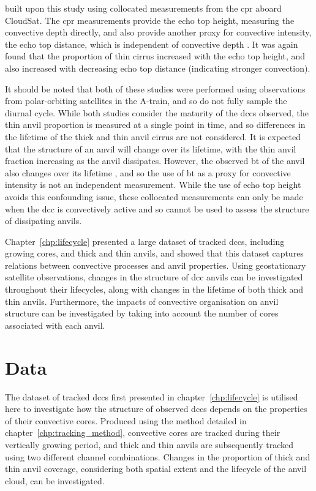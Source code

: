 \citet{takahashi_relationships_2017} built upon this study using collocated measurements from the \acrfull{cpr} aboard CloudSat.
The \acrshort{cpr} measurements provide the echo top height, measuring the convective depth directly, and also provide another proxy for convective intensity, the echo top distance, which is independent of convective depth \citep{takahashi_characterizing_2014}.
It was again found that the proportion of thin cirrus increased with the echo top height, and also increased with decreasing echo top distance (indicating stronger convection).

It should be noted that both of these studies were performed using observations from polar-orbiting satellites in the A-train, and so do not fully sample the diurnal cycle.
While both studies consider the maturity of the \acrshort{dcc}s observed, the thin anvil proportion is measured at a single point in time, and so differences in the lifetime of the thick and thin anvil cirrus are not considered.
It is expected that the structure of an anvil will change over its lifetime, with the thin anvil fraction increasing as the anvil dissipates.
However, the observed \acrshort{bt} of the anvil also changes over its lifetime \citep{futyan_deep_2007}, and so the use of \acrshort{bt} as a proxy for convective intensity is not an independent measurement.
While the use of echo top height avoids this confounding issue, these collocated measurements can only be made when the \acrfull{dcc} is convectively active and so cannot be used to assess the structure of dissipating anvils.

Chapter~\ref{chp:lifecycle} presented a large dataset of tracked \acrshort{dcc}s, including growing cores, and thick and thin anvils, and showed that this dataset captures relations between convective processes and anvil properties.
Using geostationary satellite observations, changes in the structure of \acrshort{dcc} anvils can be investigated throughout their lifecycles, along with changes in the lifetime of both thick and thin anvils.
Furthermore, the impacts of convective organisation on anvil structure can be investigated by taking into account the number of cores associated with each anvil.


\section{Data}

The dataset of tracked \acrshort{dcc}s first presented in chapter~\ref{chp:lifecycle} is utilised here to investigate how the structure of observed \acrshort{dcc}s depends on the properties of their convective cores.
Produced using the method detailed in chapter~\ref{chp:tracking_method}, convective cores are tracked during their vertically growing period, and thick and thin anvils are subsequently tracked using two different channel combinations.
Changes in the proportion of thick and thin anvil coverage, considering both spatial extent and the lifecycle of the anvil cloud, can be investigated.


